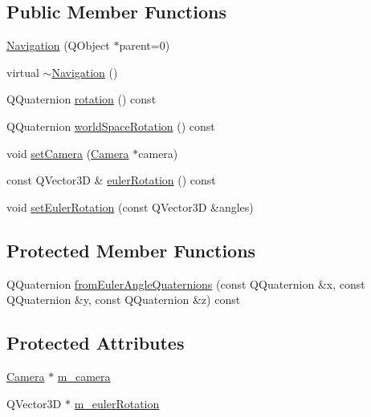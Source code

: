 \subsection*{Public Member Functions}
\begin{DoxyCompactItemize}
\item 
\hyperlink{class_navigation_a9848e09ca6fab3590ffdb0e1c188f31d}{Navigation} (Q\+Object $\ast$parent=0)
\item 
virtual \hyperlink{class_navigation_addd4022d716df48f4e55a1db69361ba7}{$\sim$\+Navigation} ()
\item 
Q\+Quaternion \hyperlink{class_navigation_a264e178e874b62aec38c9986a234d044}{rotation} () const 
\item 
Q\+Quaternion \hyperlink{class_navigation_adedf1fd31c40b2ba7461f67387bbb00c}{world\+Space\+Rotation} () const 
\item 
void \hyperlink{class_navigation_a945e0c9bd30f3c66da040f3242864027}{set\+Camera} (\hyperlink{class_camera}{Camera} $\ast$camera)
\item 
const Q\+Vector3\+D \& \hyperlink{class_navigation_ac756f0b773b771556505a8f20a5f2cf1}{euler\+Rotation} () const 
\item 
void \hyperlink{class_navigation_a4d9b8c12ac091a1db0c3b89f0e36cedd}{set\+Euler\+Rotation} (const Q\+Vector3\+D \&angles)
\end{DoxyCompactItemize}
\subsection*{Protected Member Functions}
\begin{DoxyCompactItemize}
\item 
Q\+Quaternion \hyperlink{class_navigation_a210a31fd6fc626468793b4dbeefcaf2c}{from\+Euler\+Angle\+Quaternions} (const Q\+Quaternion \&x, const Q\+Quaternion \&y, const Q\+Quaternion \&z) const 
\end{DoxyCompactItemize}
\subsection*{Protected Attributes}
\begin{DoxyCompactItemize}
\item 
\hyperlink{class_camera}{Camera} $\ast$ \hyperlink{class_navigation_a76a3e3ea5f8d81a19b22806eb3536302}{m\+\_\+camera}
\item 
Q\+Vector3\+D $\ast$ \hyperlink{class_navigation_a6b056244895c4250c697f6b924874b05}{m\+\_\+euler\+Rotation}
\end{DoxyCompactItemize}


